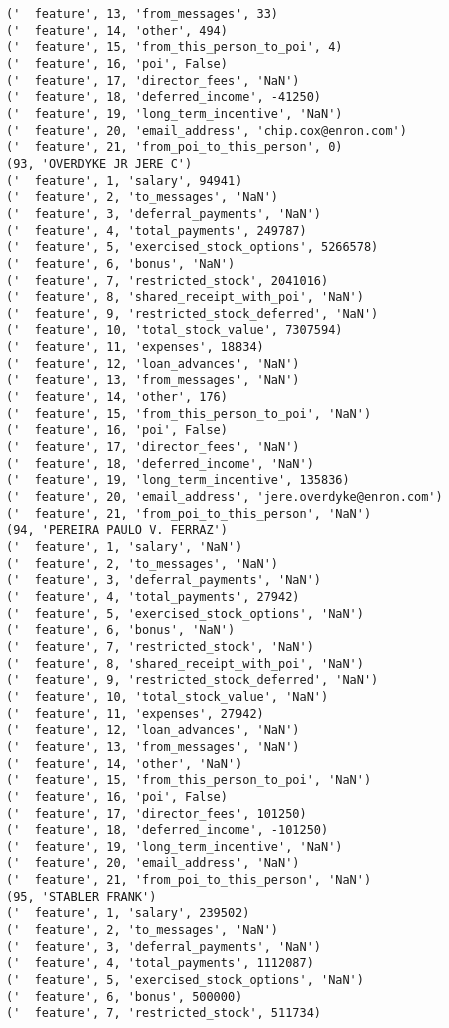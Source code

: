 \begin{verbatim}
('  feature', 13, 'from_messages', 33)
('  feature', 14, 'other', 494)
('  feature', 15, 'from_this_person_to_poi', 4)
('  feature', 16, 'poi', False)
('  feature', 17, 'director_fees', 'NaN')
('  feature', 18, 'deferred_income', -41250)
('  feature', 19, 'long_term_incentive', 'NaN')
('  feature', 20, 'email_address', 'chip.cox@enron.com')
('  feature', 21, 'from_poi_to_this_person', 0)
(93, 'OVERDYKE JR JERE C')
('  feature', 1, 'salary', 94941)
('  feature', 2, 'to_messages', 'NaN')
('  feature', 3, 'deferral_payments', 'NaN')
('  feature', 4, 'total_payments', 249787)
('  feature', 5, 'exercised_stock_options', 5266578)
('  feature', 6, 'bonus', 'NaN')
('  feature', 7, 'restricted_stock', 2041016)
('  feature', 8, 'shared_receipt_with_poi', 'NaN')
('  feature', 9, 'restricted_stock_deferred', 'NaN')
('  feature', 10, 'total_stock_value', 7307594)
('  feature', 11, 'expenses', 18834)
('  feature', 12, 'loan_advances', 'NaN')
('  feature', 13, 'from_messages', 'NaN')
('  feature', 14, 'other', 176)
('  feature', 15, 'from_this_person_to_poi', 'NaN')
('  feature', 16, 'poi', False)
('  feature', 17, 'director_fees', 'NaN')
('  feature', 18, 'deferred_income', 'NaN')
('  feature', 19, 'long_term_incentive', 135836)
('  feature', 20, 'email_address', 'jere.overdyke@enron.com')
('  feature', 21, 'from_poi_to_this_person', 'NaN')
(94, 'PEREIRA PAULO V. FERRAZ')
('  feature', 1, 'salary', 'NaN')
('  feature', 2, 'to_messages', 'NaN')
('  feature', 3, 'deferral_payments', 'NaN')
('  feature', 4, 'total_payments', 27942)
('  feature', 5, 'exercised_stock_options', 'NaN')
('  feature', 6, 'bonus', 'NaN')
('  feature', 7, 'restricted_stock', 'NaN')
('  feature', 8, 'shared_receipt_with_poi', 'NaN')
('  feature', 9, 'restricted_stock_deferred', 'NaN')
('  feature', 10, 'total_stock_value', 'NaN')
('  feature', 11, 'expenses', 27942)
('  feature', 12, 'loan_advances', 'NaN')
('  feature', 13, 'from_messages', 'NaN')
('  feature', 14, 'other', 'NaN')
('  feature', 15, 'from_this_person_to_poi', 'NaN')
('  feature', 16, 'poi', False)
('  feature', 17, 'director_fees', 101250)
('  feature', 18, 'deferred_income', -101250)
('  feature', 19, 'long_term_incentive', 'NaN')
('  feature', 20, 'email_address', 'NaN')
('  feature', 21, 'from_poi_to_this_person', 'NaN')
(95, 'STABLER FRANK')
('  feature', 1, 'salary', 239502)
('  feature', 2, 'to_messages', 'NaN')
('  feature', 3, 'deferral_payments', 'NaN')
('  feature', 4, 'total_payments', 1112087)
('  feature', 5, 'exercised_stock_options', 'NaN')
('  feature', 6, 'bonus', 500000)
('  feature', 7, 'restricted_stock', 511734)

\end{verbatim}
